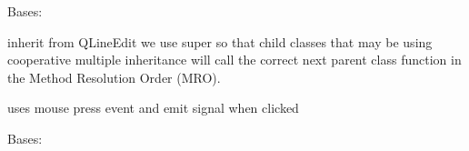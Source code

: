 \documentclass[letterpaper,10pt,english]{sphinxmanual}
\begin{document}
\begin{fulllineitems}
\label{support_classes:support_classes.LineEdit}
Bases: 

inherit from QLineEdit
we use super so that child classes that may be using cooperative multiple inheritance will call the correct next parent class function in the Method Resolution Order (MRO).

uses mouse press event and emit signal when clicked

\begin{fulllineitems}
\label{support_classes:support_classes.LineEdit.signal_evoke_kb}
\end{fulllineitems}


\begin{fulllineitems}
\label{support_classes:support_classes.LineEdit.mousePressEvent}
\end{fulllineitems}


\end{fulllineitems}


\begin{fulllineitems}
\label{support_classes:support_classes.Key}
Bases: 

\end{fulllineitems}

\end{document}
